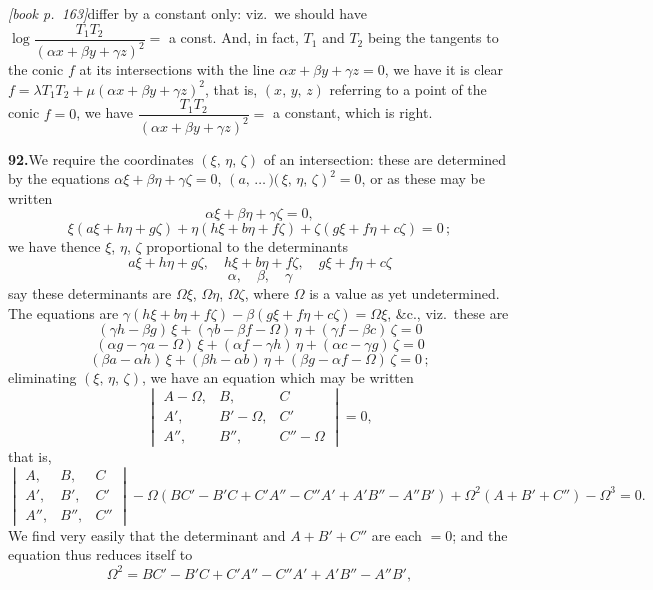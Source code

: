 \documentclass[11pt,a4paper]{article}
\begin{document}
\medskip\noindent\textit{[book p.~163]}\quad differ by a constant only: viz.\ we should have $\log\dfrac{T_1 T_2}{(\alpha x + \beta y + \gamma z)^2} = $ a const. And, in fact, $T_1$ and $T_2$ being the tangents to the conic $f$ at its intersections with the line $\alpha x + \beta y + \gamma z = 0$, we have it is clear $f = \lambda T_1 T_2 + \mu(\alpha x + \beta y + \gamma z)^2$, that is, $(x,\,y,\,z)$ referring to a point of the conic $f = 0$, we have $\dfrac{T_1 T_2}{(\alpha x + \beta y + \gamma z)^2} = $ a constant, which is right.

\medskip\noindent\textbf{92.}\quad We require the coordinates $(\xi,\,\eta,\,\zeta)$ of an intersection: these are determined by the equations $\alpha\xi + \beta\eta + \gamma\zeta = 0$, $(a,\,\ldots\!\,\mbox{$)\!($}\,\xi,\,\eta,\,\zeta)^2 = 0$, or as these may be written
\[
\alpha\xi + \beta\eta + \gamma\zeta = 0,
\]
\[
\xi(a\xi + h\eta + g\zeta) + \eta(h\xi + b\eta + f\zeta) + \zeta(g\xi + f\eta + c\zeta) = 0\,;
\]
we have thence $\xi$, $\eta$, $\zeta$ proportional to the determinants
\[
a\xi + h\eta + g\zeta,\quad h\xi + b\eta + f\zeta,\quad g\xi + f\eta + c\zeta
\]
\[
\alpha,\quad\beta,\quad\gamma
\]
say these determinants are $\Omega\xi$, $\Omega\eta$, $\Omega\zeta$, where $\Omega$ is a value as yet undetermined. The equations are $\gamma(h\xi + b\eta + f\zeta) - \beta(g\xi + f\eta + c\zeta) = \Omega\xi$, \&c., viz.\ these are
\[
(\gamma h - \beta g)\,\xi + (\gamma b - \beta f - \Omega)\,\eta + (\gamma f - \beta c)\,\zeta = 0
\]
\[
(\alpha g - \gamma a - \Omega)\,\xi + (\alpha f - \gamma h)\,\eta + (\alpha c - \gamma g)\,\zeta = 0
\]
\[
(\beta a - \alpha h)\,\xi + (\beta h - \alpha b)\,\eta + (\beta g - \alpha f - \Omega)\,\zeta = 0\,;
\]
eliminating $(\xi,\,\eta,\,\zeta)$, we have an equation which may be written
\[
\begin{vmatrix}
A - \Omega, & B, & C\\
A', & B' - \Omega, & C'\\
A'', & B'', & C'' - \Omega
\end{vmatrix} = 0,
\]
that is,
\[
\begin{vmatrix}
A, & B, & C\\
A', & B', & C'\\
A'', & B'', & C''
\end{vmatrix}
- \Omega(BC' - B'C + C'A'' - C''A' + A'B'' - A''B') + \Omega^2(A + B' + C'') - \Omega^3 = 0.
\]
We find very easily that the determinant and $A + B' + C''$ are each $= 0$; and the equation thus reduces itself to
\[
\Omega^2 = BC' - B'C + C'A'' - C''A' + A'B'' - A''B',
\]
\end{document}
